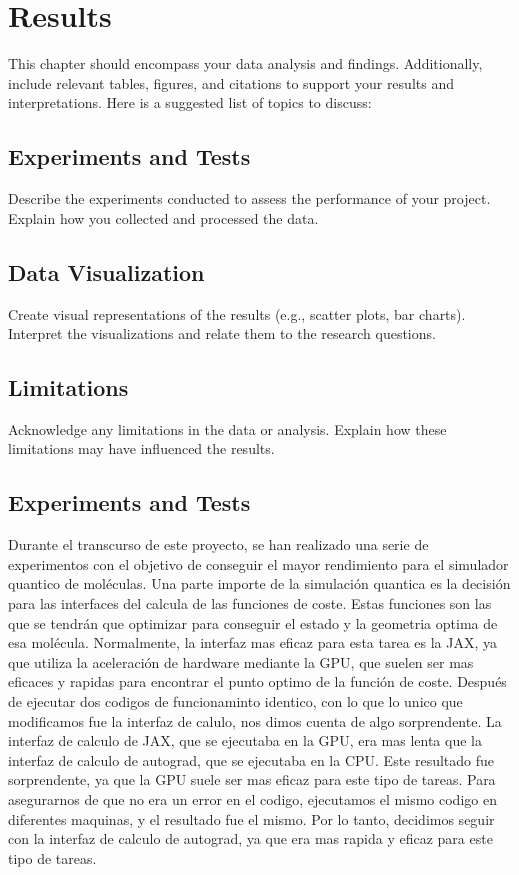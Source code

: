 
\chapter{Results}
This chapter should encompass your data analysis and findings. Additionally, include relevant tables, figures, and citations to support your results and interpretations. Here is a suggested list of topics to discuss:

  \section{Experiments and Tests}
  Describe the experiments conducted to assess the performance of your project. Explain how you collected and processed the data.
  
  \section{Data Visualization}
  Create visual representations of the results (e.g., scatter plots, bar charts). Interpret the visualizations and relate them to the research questions.
  
  \section{Limitations}
  Acknowledge any limitations in the data or analysis. Explain how these limitations may have influenced the results.

\section{Experiments and Tests}
Durante el transcurso de este proyecto, se han realizado una serie de experimentos con el objetivo de conseguir el mayor rendimiento para el simulador quantico de moléculas. Una parte importe de la simulación quantica es la decisión para las interfaces del calcula de las funciones de coste. Estas funciones son las que se tendrán que optimizar para conseguir el estado y la geometria optima de esa molécula. Normalmente, la interfaz mas eficaz para esta tarea es la JAX, ya que utiliza la aceleración de hardware mediante la GPU, que suelen ser mas eficaces y rapidas para encontrar el punto optimo de la función de coste. Después de ejecutar dos codigos de funcionaminto identico, con lo que lo unico que modificamos fue la interfaz de calulo, nos dimos cuenta de algo sorprendente. La interfaz de calculo de JAX, que se ejecutaba en la GPU, era mas lenta que la interfaz de calculo de autograd, que se ejecutaba en la CPU. Este resultado fue sorprendente, ya que la GPU suele ser mas eficaz para este tipo de tareas. Para asegurarnos de que no era un error en el codigo, ejecutamos el mismo codigo en diferentes maquinas, y el resultado fue el mismo. Por lo tanto, decidimos seguir con la interfaz de calculo de autograd, ya que era mas rapida y eficaz para este tipo de tareas.

